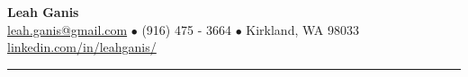 \documentclass[letterpaper, onecolumn, oneside]{article}
\begin{document}

\begin{center}

{\Large \bfseries Leah Ganis}\\[4pt]
\href{mailto:leah.ganis@gmail.com}{leah.ganis@gmail.com} $\bullet$ (916) 475 - 3664 $\bullet$ Kirkland, WA 98033 \\
\url{linkedin.com/in/leahganis/}  %

\textcolor{litegrey}{\rule{\textwidth}{.1pt}}

\end{center}
\end{document}
